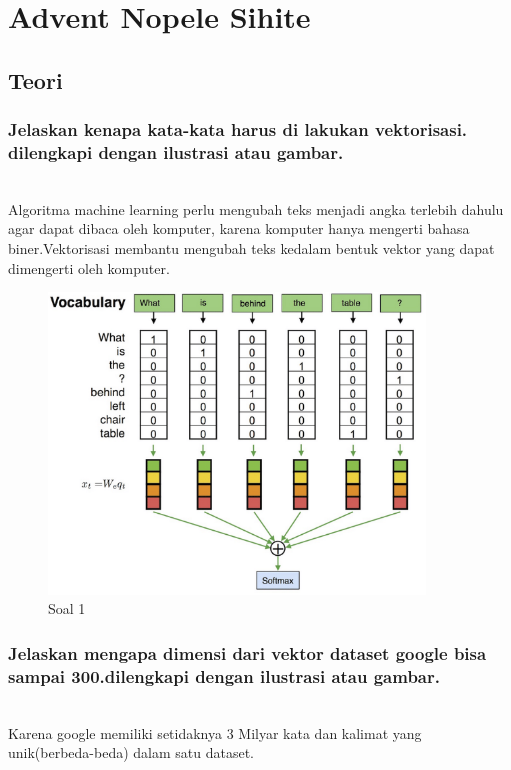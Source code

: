 \section{Advent Nopele Sihite}

\subsection{Teori}
	
	\subsubsection{Jelaskan kenapa kata-kata harus di lakukan vektorisasi. dilengkapi dengan ilustrasi atau gambar.}
	\hfill\\
	Algoritma machine learning perlu mengubah teks menjadi angka terlebih dahulu agar dapat dibaca oleh komputer, karena komputer hanya mengerti bahasa biner.Vektorisasi membantu mengubah teks kedalam bentuk vektor yang dapat dimengerti oleh komputer. 
	
	\begin{figure}[H]
		\begin{center}
		 \includegraphics[width=10cm]{figures/1174076/figures5/teori1.png}
		 \caption{Soal 1}	
		\end{center}
	\end{figure}

	\subsubsection{Jelaskan mengapa dimensi dari vektor dataset google bisa sampai 300.dilengkapi dengan ilustrasi atau gambar.}
	\hfill\\
	Karena google memiliki setidaknya 3 Milyar kata dan kalimat yang unik(berbeda-beda) dalam satu dataset.
	

